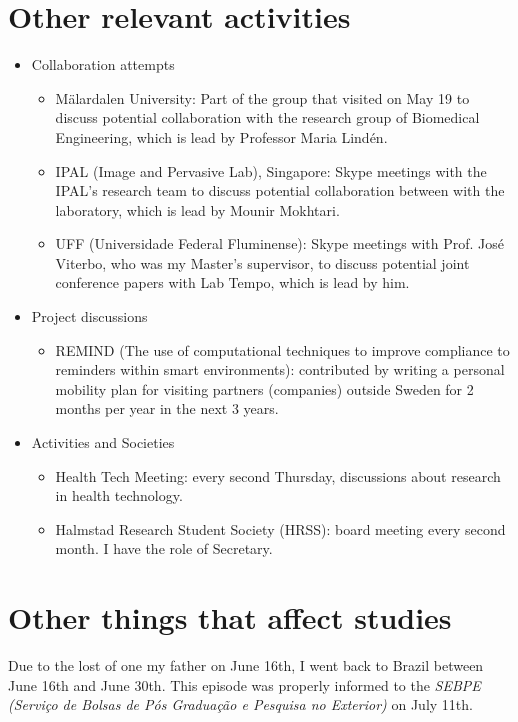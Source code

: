 \documentclass[]{report}
\begin{document}
\section*{Other relevant activities}
\begin{itemize}
	\item Collaboration attempts
		\begin{itemize}
			\item M\"{a}lardalen University: Part of the group that visited on May 19 to discuss potential collaboration with the research group of Biomedical Engineering, which is lead by Professor Maria Lind\'{e}n. 
			\item IPAL (Image and Pervasive Lab), Singapore: Skype meetings with the IPAL's research team to discuss potential collaboration between with the laboratory, which is lead by Mounir Mokhtari.
			\item UFF (Universidade Federal Fluminense): Skype meetings with Prof. Jos\'{e} Viterbo, who was my Master's supervisor, to discuss potential joint conference papers with Lab Tempo, which is lead by him.
		\end{itemize}
	\item Project discussions
	\begin{itemize}
		\item REMIND (The use of computational techniques to improve compliance to reminders within smart environments): contributed by writing a personal mobility plan for visiting partners (companies) outside Sweden for 2 months per year in the next 3 years.
	\end{itemize}
	\item Activities and Societies
	\begin{itemize}
		\item Health Tech Meeting: every second Thursday, discussions about research in health technology.
		\item Halmstad Research Student Society (HRSS): board meeting every second month. I have the role of Secretary.
	\end{itemize}
\end{itemize}

\section*{Other things that affect studies}

Due to the lost of one my father on June 16th, I went back to Brazil between June 16th and June 30th. This episode was properly informed to the \textit{SEBPE (Servi\c{c}o de Bolsas de P\'{o}s Gradua\c{c}\~{a}o e Pesquisa no Exterior)} on July 11th. 

{}

\end{document}
